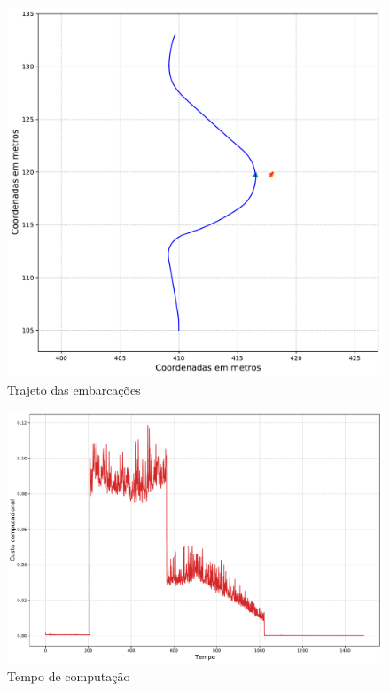             \begin{figure}[H]
                \centering
                \includegraphics[scale=0.45]{fig/chap5/crossing_right_stopped_vessel_no_cpa_trajectory.pdf}
                \caption{Trajeto das embarcações}
                \label{fig:chap5_crossing_right_stopped_vessel_no_cpa_paths}
            \end{figure}
            
            \begin{figure}[H]
                \centering
                \includegraphics[scale=0.3]{fig/chap5/crossing_right_stopped_vessel_no_cpa_computation_time.pdf}
                \caption{Tempo de computação}
                \label{fig:chap5_crossing_right_stopped_vessel_no_cpa_computation_time}
            \end{figure}
            
